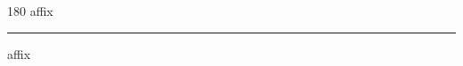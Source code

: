 
\begin{frame}
\begin{center}
\begin{turn}{180}
{\fontsize{2.5cm}{1em}\selectfont affix}
\end{turn}
\vspace{1em}\par  
\hrule
\vspace{1em}\par  
{\fontsize{2.5cm}{1em}\selectfont affix}
\end{center}
\end{frame}

